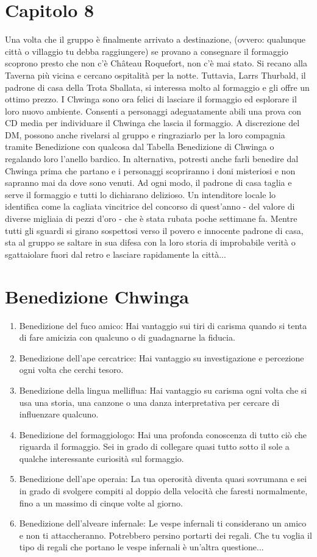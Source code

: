 \documentclass{article}
\begin{document}
\section{Capitolo 8}
Una volta che il gruppo è finalmente arrivato a destinazione, (ovvero: qualunque città o villaggio tu debba raggiungere) se provano a consegnare il formaggio scoprono presto che non c'è Château Roquefort, non c'è mai stato.
Si recano alla Taverna più vicina e cercano ospitalità per la notte.
Tuttavia, Larrs Thurbald, il padrone di casa della Trota Sballata, si interessa molto al formaggio e gli offre un ottimo prezzo.
I Chwinga sono ora felici di lasciare il formaggio ed esplorare il loro nuovo ambiente. Consenti a personaggi adeguatamente abili una prova con CD media per individuare il Chwinga che lascia il formaggio.
A discrezione del DM, possono anche rivelarsi al gruppo e ringraziarlo per la loro compagnia tramite Benedizione con qualcosa dal Tabella Benedizione di Chwinga o regalando loro l'anello bardico.
In alternativa, potresti anche farli benedire dal Chwinga prima che partano e i personaggi scopriranno i doni misteriosi e non sapranno mai da dove sono venuti.
Ad ogni modo, il padrone di casa taglia e serve il formaggio e tutti lo dichiarano delizioso.
Un intenditore locale lo identifica come la cagliata vincitrice del concorso di quest'anno - del valore di diverse migliaia di pezzi d'oro - che è stata rubata poche settimane fa. Mentre tutti gli sguardi si girano sospettosi verso il povero e innocente padrone di casa, sta al gruppo se saltare in sua difesa con la loro storia di improbabile verità o sgattaiolare fuori dal retro e lasciare rapidamente la città...


\section{Benedizione Chwinga}
\begin{enumerate}
    \item Benedizione del fuco amico: Hai vantaggio sui tiri di carisma quando si tenta di fare amicizia con qualcuno o di guadagnarne la fiducia.
    \item Benedizione dell’ape cercatrice: Hai vantaggio su investigazione e percezione ogni volta che cerchi tesoro.
    \item Benedizione della lingua melliflua: Hai vantaggio su carisma ogni volta che si usa una storia, una canzone o una danza interpretativa per cercare di influenzare qualcuno.
    \item Benedizione del formaggiologo: Hai una profonda conoscenza di tutto ciò che riguarda il formaggio. Sei in grado di collegare quasi tutto sotto il sole a qualche interessante curiosità sul formaggio.
    \item Benedizione dell’ape operaia: La tua operosità diventa quasi sovrumana e sei in grado di svolgere compiti al doppio della velocità che faresti normalmente, fino a un massimo di cinque volte al giorno.
    \item Benedizione dell’alveare infernale: Le vespe infernali ti considerano un amico e non ti attaccheranno. Potrebbero persino portarti dei regali. Che tu voglia il tipo di regali che portano le vespe infernali è un'altra questione...
\end{enumerate}
\end{document}

